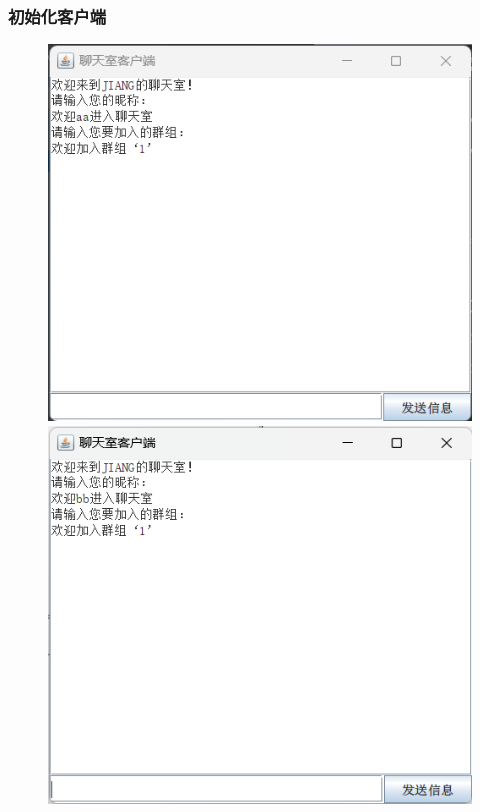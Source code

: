 \documentclass[UTF8,12pt]{article}
\begin{document}
\subsubsection{初始化客户端}
\begin{figure}[htbp]
	\centering
	\begin{minipage}{0.3\linewidth}
		\centering
		\includegraphics[width=0.9\linewidth]{img/3.png}
	\end{minipage}
	\begin{minipage}{0.3\linewidth}
		\centering
		\includegraphics[width=0.9\linewidth]{img/4.png}
	\end{minipage}
	\qquad
	

\end{figure}
\end{document}
